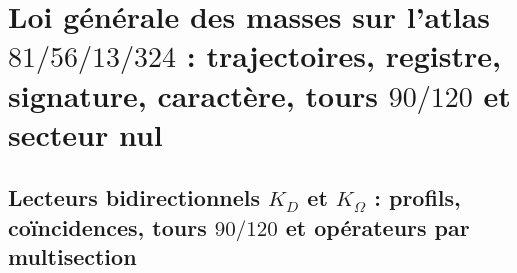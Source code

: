 \chapter{Loi générale des masses sur l'atlas \texorpdfstring{\(81/56/13/324\)}{81/56/13/324} : trajectoires, registre, signature, caractère, tours \texorpdfstring{\(90/120\)}{90/120} et secteur nul}
\label{chap:md-ley-general-masas-definitiva}
\begingroup
\renewcommand{\chapter}[2][]{}%

\endgroup

\begingroup
\let\HMTOwnerSection\section
\let\HMTOwnerSubsection\subsection
\let\HMTOwnerSubsubsection\subsubsection
\let\HMTOwnerParagraph\paragraph
\let\chapter\HMTOwnerSection
\let\section\HMTOwnerSubsection
\let\subsection\HMTOwnerSubsubsection
\let\subsubsection\HMTOwnerParagraph

\endgroup

\chapter{Lecteurs bidirectionnels \texorpdfstring{\(K_D\)}{K D} et \texorpdfstring{\(K_\Omega\)}{K Omega} : profils, coïncidences, tours \texorpdfstring{\(90/120\)}{90/120} et opérateurs par multisection}
\label{chap:md-lectores-masicos-definitivo}
\begingroup
\renewcommand{\chapter}[2][]{}%

\endgroup


